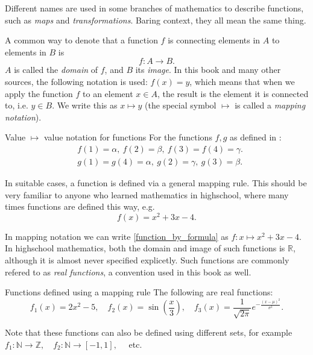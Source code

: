 Different names are used in some branches of mathematics to describe functions, such as \emph{maps} and \emph{transformations}. Baring context, they all mean the same thing.

A common way to denote that a function $f$ is connecting elements in $A$ to elements in $B$ is
\begin{equation}
	f: A\to B.
	\label{eq:function_basics}
\end{equation}
$A$ is called the \emph{domain} of $f$, and $B$ its \emph{image}. In this book and many other sources, the following notation is used: $f(x)=y$, which means that when we apply the function $f$ to an element $x\in A$, the result is the element it is connected to, i.e. $y\in B$. We write this as $x\mapsto y$ (the special symbol $\mapsto$ is called a \emph{mapping notation}).

\begin{example}{Value $\mapsto$ value notation for functions}{}
	For the functions $f,g$ as defined in :
	\begin{align*}
		&f(1)=\alpha,\ f(2)=\beta,\ f(3)=f(4)=\gamma.\\
		&g(1)=g(4)=\alpha,\ g(2)=\gamma,\ g(3)=\beta.
	\end{align*}
\end{example}

In suitable cases, a function is defined via a general mapping rule. This should be very familiar to anyone who learned mathematics in highschool, where many times functions are defined this way, e.g.
\begin{equation}
	f(x) = x^{2}+3x-4.
	\label{eq:function_by_formula}
\end{equation}

In mapping notation we can write \eqref{function_by_formula} as $f:x\mapsto x^{2}+3x-4$. In highschool mathematics, both the domain and image of such functions is $\mathbb{R}$, although it is almost never specified explicetly. Such functions are commonly refered to as \emph{real functions}, a convention used in this book as well.

\begin{example}{Functions defined using a mapping rule}{}
	The following are real functions:
	\[
		f_{1}(x) = 2x^{2}-5,\quad f_{2}(x)=\sin\left( \frac{x}{3} \right),\quad f_{3}(x)=\frac{1}{\sqrt{2\pi}}e^{-\frac{(x-\mu)^{2}}{\sigma^{2}}}.
	\]

	Note that these functions can also be defined using different sets, for example $f_{1}:\mathbb{N}\to\mathbb{Z},\quad f_{2}:\mathbb{N}\to[-1,1],\quad$ etc.
\end{example}


